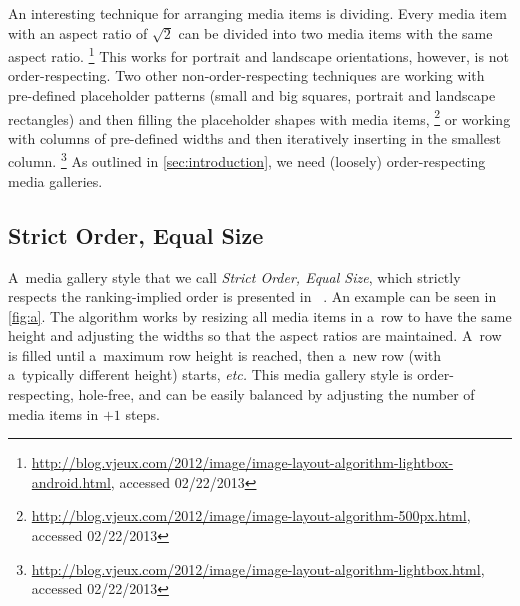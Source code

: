 \documentclass{sig-alternate}
\newcommand{\inlinelistingsize}{\fontsize{8pt}{11pt}}
\let\oldurl\url
\renewcommand{\url}[1]{\inlinelistingsize\oldurl{#1}}
\begin{document}
An interesting technique for arranging media items is dividing.
Every media item with an aspect ratio of $ \sqrt2 $ can be divided
into two media items with the same aspect ratio.%
\footnote{\url{http://blog.vjeux.com/2012/image/image-layout-algorithm-lightbox-android.html},
accessed 02/22/2013}
This works for portrait and landscape orientations,
however, is not order-respecting.
Two other non-order-respecting techniques are working
with pre-defined placeholder patterns
(small and big squares, portrait and landscape rectangles)
and then filling the placeholder shapes with media items,%
\footnote{\url{http://blog.vjeux.com/2012/image/image-layout-algorithm-500px.html},
accessed 02/22/2013}
or working with columns of pre-defined widths
and then iteratively inserting in the smallest column.%
\footnote{\url{http://blog.vjeux.com/2012/image/image-layout-algorithm-lightbox.html},
accessed 02/22/2013}
As outlined in \autoref{sec:introduction},
we need (loosely) order-respecting media galleries.

\subsection{Strict Order, Equal Size}

A~media gallery style that we call \emph{Strict Order, Equal Size},
which strictly respects the ranking-implied order is presented in~%
\cite{chedeau2012googleplus}.
An example can be seen in \autoref{fig:a}.
The algorithm works by resizing all media items in a~row to have the same height
and adjusting the widths so that the aspect ratios are maintained.
A~row is filled until a~maximum row height is reached,
then a~new row (with a~typically different height) starts, \emph{etc.}
This media gallery style is order-respecting, hole-free,
and can be easily balanced by adjusting the number
of media items in $+1$ steps.
\end{document}
